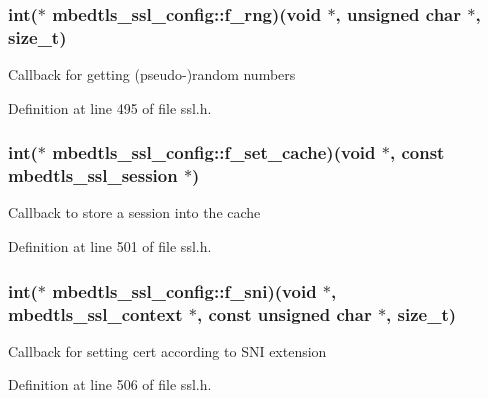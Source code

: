 \hypertarget{structmbedtls__ssl__config_a816c169ce1ecc8a17797085f3b3915ee}{
\subsubsection[{f\-\_\-rng}]{\setlength{\rightskip}{0pt plus 5cm}int($\ast$ mbedtls\-\_\-ssl\-\_\-config\-::f\-\_\-rng)(void $\ast$, unsigned char $\ast$, size\-\_\-t)}}\label{structmbedtls__ssl__config_a816c169ce1ecc8a17797085f3b3915ee}
Callback for getting (pseudo-\/)random numbers 

Definition at line 495 of file ssl.\-h.

\hypertarget{structmbedtls__ssl__config_a9a46ae5b0da844020d37aa1fcd663e7c}{
\subsubsection[{f\-\_\-set\-\_\-cache}]{\setlength{\rightskip}{0pt plus 5cm}int($\ast$ mbedtls\-\_\-ssl\-\_\-config\-::f\-\_\-set\-\_\-cache)(void $\ast$, const {\bf mbedtls\-\_\-ssl\-\_\-session} $\ast$)}}\label{structmbedtls__ssl__config_a9a46ae5b0da844020d37aa1fcd663e7c}
Callback to store a session into the cache 

Definition at line 501 of file ssl.\-h.

\hypertarget{structmbedtls__ssl__config_aa649f149ca69b2ce28fa25e31097f80a}{
\subsubsection[{f\-\_\-sni}]{\setlength{\rightskip}{0pt plus 5cm}int($\ast$ mbedtls\-\_\-ssl\-\_\-config\-::f\-\_\-sni)(void $\ast$, {\bf mbedtls\-\_\-ssl\-\_\-context} $\ast$, const unsigned char $\ast$, size\-\_\-t)}}\label{structmbedtls__ssl__config_aa649f149ca69b2ce28fa25e31097f80a}
Callback for setting cert according to S\-N\-I extension 

Definition at line 506 of file ssl.\-h.

